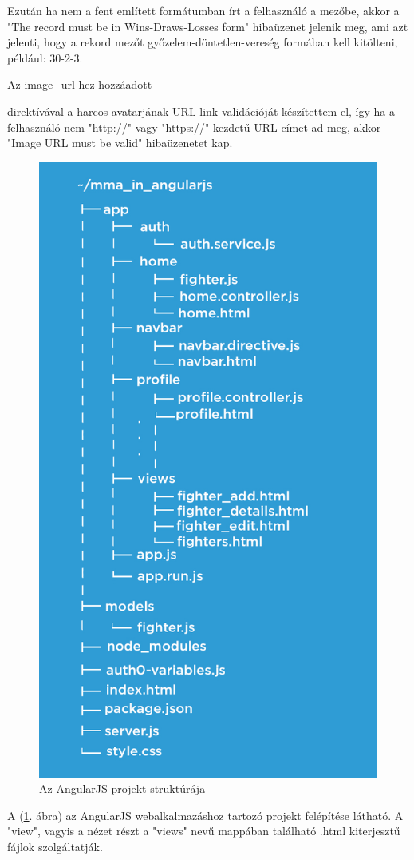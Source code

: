 Ezután ha nem a fent említett formátumban írt a felhasználó a mezőbe, akkor a "The record must be in Wins-Draws-Losses form" hibaüzenet jelenik meg, ami azt jelenti, hogy a rekord mezőt győzelem-döntetlen-vereség formában kell kitölteni, például: 30-2-3.

Az image\_url-hez hozzáadott 
direktívával a harcos avatarjának URL link validációját készítettem el, így ha a felhasználó nem "http://" vagy "https://" kezdetű URL címet ad meg, akkor "Image URL must be valid" hibaüzenetet kap.


\begin{figure}[htb]
\centering
\includegraphics[scale=0.8]{kepek/mma_in_angularjs.jpeg}
\caption{Az AngularJS projekt struktúrája}
\label{fig:angularjs_structure}
\end{figure}

A (\ref{fig:angularjs_structure}. ábra) az AngularJS webalkalmazáshoz tartozó projekt felépítése látható. A "view", vagyis a nézet részt a "views" nevű mappában található .html kiterjesztű fájlok szolgáltatják.  \cite{AngularJS könyv} 

